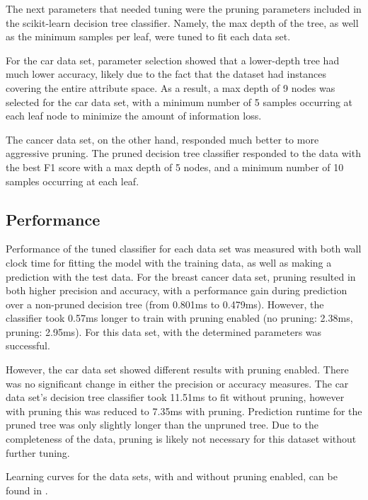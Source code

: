 \documentclass{article}
\begin{document}
    The next parameters that needed tuning were the pruning parameters included in the scikit-learn decision tree classifier. Namely, the max depth of the tree, as well as the minimum samples per leaf, were tuned to fit each data set.

    For the car data set, parameter selection showed that a lower-depth tree had much lower accuracy, likely due to the fact that the dataset had instances covering the entire attribute space. As a result, a max depth of 9 nodes was selected for the car data set, with a minimum number of 5 samples occurring at each leaf node to minimize the amount of information loss.

    The cancer data set, on the other hand, responded much better to more aggressive pruning. The pruned decision tree classifier responded to the data with the best F1 score with a max depth of 5 nodes, and a minimum number of 10 samples occurring at each leaf.

    \subsection{Performance}
    Performance of the tuned classifier for each data set was measured with both wall clock time for fitting the model with the training data, as well as making a prediction with the test data. For the breast cancer data set, pruning resulted in both higher precision and accuracy, with a performance gain during prediction over a non-pruned decision tree (from 0.801ms to 0.479ms). However, the classifier took 0.57ms longer to train with pruning enabled (no pruning: 2.38ms, pruning: 2.95ms). For this data set, with the determined parameters was successful.

    However, the car data set showed different results with pruning enabled. There was no significant change in either the precision or accuracy measures. The car data set's decision tree classifier took 11.51ms to fit without pruning, however with pruning this was reduced to 7.35ms with pruning. Prediction runtime for the pruned tree was only slightly longer than the unpruned tree. Due to the completeness of the data, pruning is likely not necessary for this dataset without further tuning.

    Learning curves for the data sets, with and without pruning enabled, can be found in .
\end{document}

